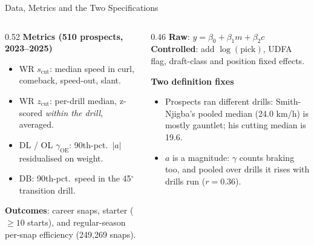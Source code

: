 \documentclass[aspectratio=169, 10pt]{beamer}
\begin{document}
\begin{frame}{Data, Metrics and the Two Specifications}
  \begin{columns}[T]
    \begin{column}{0.52\textwidth}
      \small
      \textbf{Metrics (510 prospects, 2023--2025)}
      \begin{itemize}
        \item WR $s_{\text{cut}}$: median speed in curl, comeback, speed-out, slant.
        \item WR $z_{\text{cut}}$: per-drill median, z-scored \emph{within the drill}, averaged.
        \item DL / OL $\gamma_{\text{OE}}$: 90th-pct.\ $|a|$ residualised on weight.
        \item DB: 90th-pct.\ speed in the 45$^\circ$ transition drill.
      \end{itemize}
      \textbf{Outcomes}: career snaps, starter ($\ge 10$ starts), and regular-season per-snap efficiency (249,269 snaps).
    \end{column}
    \begin{column}{0.46\textwidth}
      \small
      \textbf{Raw}: $y = \beta_0 + \beta_1 m + \beta_2 c$\\[0.4em]
      \textbf{Controlled}: add $\log(\text{pick})$, UDFA flag, draft-class and position fixed effects.
      \vspace{0.6em}
      \begin{block}{\textbf{Two definition fixes}}
        \footnotesize
        \begin{itemize}
          \item Prospects ran different drills: Smith-Njigba's pooled median (24.0 km/h) is mostly gauntlet; his cutting median is 19.6.
          \item $a$ is a magnitude: $\gamma$ counts braking too, and pooled over drills it rises with drills run ($r = 0.36$).
        \end{itemize}
      \end{block}
    \end{column}
  \end{columns}
\end{frame}
\end{document}
